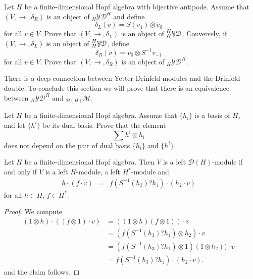\begin{exercise}
Let $H$ be a finite-dimensional Hopf algebra with bijective antipode.  Assume that
$(V,\rightarrow,\delta_R)$ is an object of $_{H}\mathcal{YD}^{H}$ and define
\[
\delta_L(v)=S(v_1)\otimes v_0
\]
for all $v\in V$.  Prove that
$(V,\rightarrow,\delta_L)$ is an object of $\prescript{H}{H}{\mathcal{YD}}$. 
Conversely, if $(V,\rightarrow,\delta_L)$ is an object of $\prescript{H}{H}{\mathcal{YD}}$,
define \[
\delta_R(v)=v_0\otimes S^{-1}v_{-1}
\]
for all $v\in V$. Prove that
$(V,\rightarrow,\delta_R)$ is an object of $_H\mathcal{YD}^H$.
\end{exercise}

There is a deep connection between Yetter-Drinfeld modules and the Drinfeld double. To conclude this section we will prove 
that there is an equivalence between $_H\mathcal{YD}^H$ and $_{\mathcal{D}(H)}\mathcal{M}$. 

\begin{exercise}
Let $H$ be a finite-dimensional Hopf algebra. Assume that $\{h_i\}$ is a basis
of $H$, and let $\{h^i\}$ be its dual basis.  Prove that the element
\[
\sum h^i\otimes h_i
\]
does not depend on the pair of dual basis $\{h_i\}$ and $\{h^i\}$.
\end{exercise}

\begin{lemma}
\label{lem:DH_compatibility}
Let $H$ be a finite-dimensional Hopf algebra. Then  $V$ is a left
$\mathcal{D}(H)$-module if and only if $V$ is a left $H$-module, a left
$H^{*}$-module and 
\begin{eqnarray}
h\cdot(f\cdot v) & = & f(S^{-1}(h_{3})?h_{1})\cdot(h_{2}\cdot v)\label{eq:compatibility_D(H)}
\end{eqnarray}
for all $h\in H$, $f\in H^{*}$.
\end{lemma}

\begin{proof}
We compute 
\begin{align*}
(1\otimes h)\cdot((f\otimes1)\cdot v) & =((1\otimes h)(f\otimes1))\cdot v\\
 & =(f(S^{-1}(h_{3})?h_{1})\otimes h_{2})\cdot v\\
 & =(f(S^{-1}(h_{3})?h_{1})\otimes1)(1\otimes h_{2}))\cdot v\\
 & =f(S^{-1}(h_{3})?h_{1})\cdot(h_{2}\cdot v).
\end{align*}
and the claim follows. 
\end{proof}

